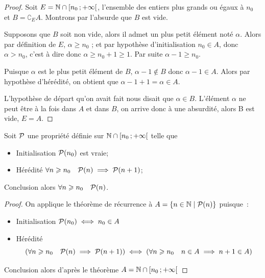 \begin{proof}
  Soit \(E = \N\cap \intervallefo{n_0}{+\infty}\), l'ensemble des entiers plus 
  grands ou égaux à \(n_0\) et \(B = \complement_E A\). Montrons par l'absurde que 
  \(B\) est vide. 

  Supposons que \(B\) soit non vide, alors il admet un plus petit élément noté 
  \(\alpha\). Alors par définition de \(E\), \(\alpha\geqslant n_0\) ; et par 
  hypothèse d'initialisation \(n_0\in A\), donc \(\alpha > n_0\), c'est à dire 
  donc \(\alpha\geqslant n_0 + 1\geqslant 1\). Par suite \(\alpha - 1\geqslant 
  n_0\). 

  Puisque \(\alpha\) est le plus petit élément de \(B\), \(\alpha - 1 \notin B\) 
  donc \(\alpha - 1 \in A\). Alors par hypothèse d'hérédité, on obtient que 
  \(\alpha - 1 + 1 = \alpha\in A\). 

  L'hypothèse de départ qu'on avait fait nous disait que \(\alpha \in B\).  
  L'élément \(\alpha\) ne peut être à la fois dans \(A\) et dans \(B\), on 
  arrive donc à une absurdité, alors B est vide, \(E = A\).
\end{proof}

\begin{cor}
  \label{cor:recsimple}
  Soit \(\P\) une propriété définie sur \(\N\cap \intervallefo{n_0}{+\infty}\) 
  telle que
  \begin{itemize}
    \item Initialisation \(\P(n_0)\) est vraie;
    \item Hérédité \(\forall n\geqslant n_0 \quad \P(n) \implies \P(n + 1)\);
  \end{itemize}
  Conclusion alors \(\forall n\geqslant n_0 \quad \P(n)\).
\end{cor}

\begin{proof}
  On applique le théorème de récurrence à \(A = \enstq{n\in\N}{\P(n)}\) puisque~:
  \begin{itemize}
    \item Initialisation \(\P(n_0) \iff n_0 \in A\)
    \item Hérédité
      \begin{equation}
        \left(\forall n\geqslant n_0 \quad \P(n) \implies \P(n + 1)\right) \iff 
        \left( \forall n \geqslant n_0 \quad n\in A \implies n + 1\in A\right)
      \end{equation}
  \end{itemize}
  Conclusion alors d'après le théorème \(A = \N\cap \intervallefo{n_0}{+\infty}\)
\end{proof}

